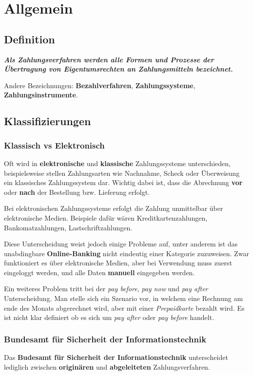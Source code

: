 
\section{Allgemein}
\subsection{Definition}
\textit{\textbf{Als Zahlungsverfahren werden alle Formen und Prozesse der Übertragung von Eigentumsrechten an Zahlungsmitteln bezeichnet.}}

Andere Bezeichnungen: \textbf{Bezahlverfahren}, \textbf{Zahlungssysteme}, \textbf{Zahlungsinstrumente}.

\subsection{Klassifizierungen}
\subsubsection{Klassisch vs Elektronisch}
Oft wird in \textbf{elektronische} und \textbf{klassische} Zahlungssysteme unterschieden, beispielsweise stellen Zahlungsarten wie Nachnahme, Scheck oder Überweisung ein klassisches Zahlungssystem dar. Wichtig dabei ist, dass die Abrechnung \textbf{vor} oder \textbf{nach} der Bestellung bzw. Lieferung erfolgt. 

Bei elektronischen Zahlungssysteme erfolgt die Zahlung unmittelbar über elektronische Medien. Beispiele dafür wären Kreditkartenzahlungen, Bankomatzahlungen, Lastschriftzahlungen. 

Diese Unterscheidung weist jedoch einige Probleme auf, unter anderem ist das unabdingbare \textbf{Online-Banking} nicht eindeutig einer Kategorie zuzuweisen. Zwar funktioniert es über elektronische Medien, aber bei Verwendung muss zuerst eingeloggt werden, und alle Daten \textbf{manuell} eingegeben werden. 

Ein weiteres Problem tritt bei der \textit{pay before}, \textit{pay now} und \textit{pay after} Unterscheidung. Man stelle sich ein Szenario vor, in welchem eine Rechnung am ende des Monats abgerechnet wird, aber mit einer \textit{Prepaidkarte} bezahlt wird. Es ist nicht klar definiert ob es sich um \textit{pay after} oder \textit{pay before} handelt.

\subsubsection{Bundesamt für Sicherheit der Informationstechnik}
Das \textbf{Budesamt für Sicherheit der Informationstechnik} unterscheidet lediglich zwischen \textbf{originären} und \textbf{abgeleiteten} Zahlungsverfahren.

